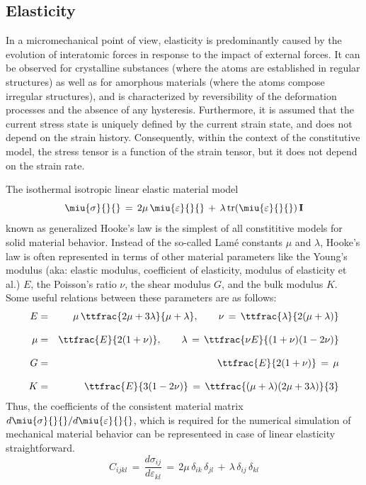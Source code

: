 \newpage
\subsection{Elasticity}
\label{sec:elasticity}

In a micromechanical point of view, elasticity is predominantly caused by the evolution of interatomic forces in response to the impact of
external forces. It can be observed for crystalline substances (where the atoms are established in regular structures) as well as for
amorphous materials (where the atoms compose irregular structures), and is characterized by reversibility of the deformation processes and
the absence of any hysteresis. Furthermore, it is assumed that the current stress state is uniquely defined by the current strain state,
and does not depend on the strain history. Consequently, within the context of the constitutive model, the stress tensor is a function of
the strain tensor, but it does not depend on the strain rate. 

The isothermal isotropic linear elastic material model 
\begin{equation}
\miu{\sigma}{}{}\,=\,2\mu\,\miu{\varepsilon}{}{}\,+\,\lambda\,\mathrm{tr}(\miu{\varepsilon}{}{})\,\mathbf{I}
\label{eq:hooke_isotherm}
\end{equation}
known as generalized Hooke's law is the simplest of all constititive models for solid material behavior. Instead of the so-called
Lam{\'{e}} constants $\mu$ and $\lambda$, Hooke's law is often represented in terms of other material parameters like the Young's modulus
(aka: elastic modulus, coefficient of elasticity, modulus of elasticity et al.) $E$, the Poisson's ratio $\nu$, the shear modulus $G$, and
the bulk modulus $K$. Some useful relations between these parameters are as follows:
\begin{eqnarray*}
E & = & \mu\,\ttfrac{2\mu+3\lambda}{\mu+\lambda},\qquad
\nu\,=\,\ttfrac{\lambda}{2(\mu+\lambda)} \\[2.0ex]
\mu & = & \ttfrac{E}{2(1+\nu)},\qquad
\lambda\,=\,\ttfrac{\nu E}{(1+\nu)(1-2\nu)} \\[2.0ex]
G & = & \ttfrac{E}{2(1+\nu)}\,=\,\mu \\[2.0ex]
K & = & \ttfrac{E}{3(1-2\nu)}\,=\,\ttfrac{(\mu+\lambda)(2\mu+3\lambda)}{3}
\end{eqnarray*}
Thus, the coefficients of the consistent material matrix $d\miu{\sigma}{}{}/d\miu{\varepsilon}{}{}$, which is required for the numerical
simulation of mechanical material behavior can be representeed in case of linear elasticity straightforward.
\begin{equation}
{C}_{ijkl}\,=\,\frac{d\sigma_{ij}}{d\varepsilon_{kl}}\,=\,2\mu\,\delta_{ik}\,\delta_{jl}\,+\,\lambda\,\delta_{ij}\,\delta_{kl}
\end{equation}

